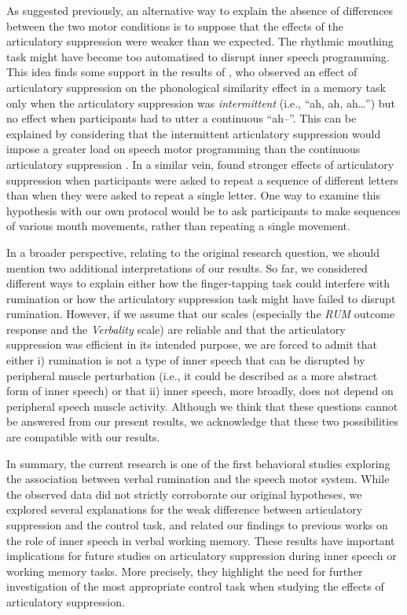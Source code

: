 \documentclass[12pt,]{book}
\begin{document}
As suggested previously, an alternative way to explain the absence of
differences between the two motor conditions is to suppose that the
effects of the articulatory suppression were weaker than we expected.
The rhythmic mouthing task might have become too automatised to disrupt
inner speech programming. This idea finds some support in the results of
\citet{Saito1997}, who observed an effect of articulatory suppression on
the phonological similarity effect in a memory task only when the
articulatory suppression was \emph{intermittent} (i.e., ``ah, ah,
ah\ldots{}'') but no effect when participants had to utter a continuous
``ah--''. This can be explained by considering that the intermittent
articulatory suppression would impose a greater load on speech motor
programming than the continuous articulatory suppression \citep[page
569]{Saito1997}. In a similar vein, \citet{Macken1995} found stronger
effects of articulatory suppression when participants were asked to
repeat a sequence of different letters than when they were asked to
repeat a single letter. One way to examine this hypothesis with our own
protocol would be to ask participants to make sequences of various mouth
movements, rather than repeating a single movement.

In a broader perspective, relating to the original research question, we
should mention two additional interpretations of our results. So far, we
considered different ways to explain either how the finger-tapping task
could interfere with rumination or how the articulatory suppression task
might have failed to disrupt rumination. However, if we assume that our
scales (especially the \emph{RUM} outcome response and the
\emph{Verbality} scale) are reliable and that the articulatory
suppression was efficient in its intended purpose, we are forced to
admit that either i) rumination is not a type of inner speech that can
be disrupted by peripheral muscle perturbation (i.e., it could be
described as a more abstract form of inner speech) or that ii) inner
speech, more broadly, does not depend on peripheral speech muscle
activity. Although we think that these questions cannot be answered from
our present results, we acknowledge that these two possibilities are
compatible with our results.

In summary, the current research is one of the first behavioral studies
exploring the association between verbal rumination and the speech motor
system. While the observed data did not strictly corroborate our
original hypotheses, we explored several explanations for the weak
difference between articulatory suppression and the control task, and
related our findings to previous works on the role of inner speech in
verbal working memory. These results have important implications for
future studies on articulatory suppression during inner speech or
working memory tasks. More precisely, they highlight the need for
further investigation of the most appropriate control task when studying
the effects of articulatory suppression.
\end{document}
